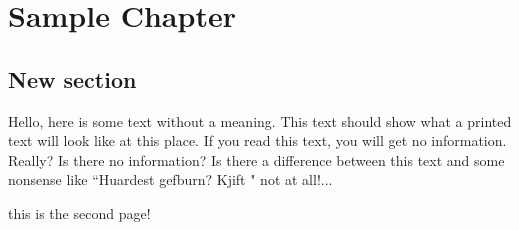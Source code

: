 \documentclass[a4paper,12pt,twoside]{book}
\begin{document}
\chapter{Sample Chapter}
\section{New section}

Hello, here is some text without a meaning.  This text should
show what a printed text will look like at this place.  If you
read this text, you will get no information.  Really?  Is there
no information?  Is there a difference between this text and some
nonsense like ``Huardest gefburn?  Kjift " not at all!...

\newpage

this is the second page!
\end{document}
